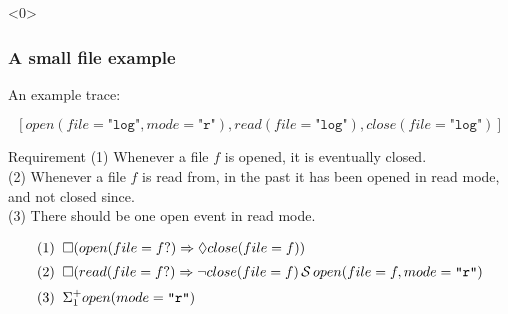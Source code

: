 \begin{frame}<0>
  \frametitle{A small file example} \small

An example trace:

\[ 
[
open(file=\texttt{"log"}, mode=\texttt{"r"}),
read(file=\texttt{"log"}),
close(file=\texttt{"log"})
]
\]

\pause

\begin{block}{Requirement}
(1) Whenever a file $f$ is opened, it is eventually closed.\\
(2) Whenever a file $f$ is read from, in the past it has been opened in read mode, and not closed since.\\
(3) There should be one open event in read mode.
\end{block}

\pause

\begin{equation*}
\begin{aligned}
(1) \;&\; \Box (open(file=f?) \Rightarrow \Diamond close(file=f)) \\[0.5ex]
(2) \;&\; \Box (read(file=f?) \Rightarrow \neg close(file=f) \,{\cal S}\, open(file=f, mode=\texttt{"r"}) \\[0.5ex]
(3) \;&\; \Sigma^{+}_1 open(mode=\texttt{"r"})
\end{aligned}
\end{equation*}

\end{frame}

